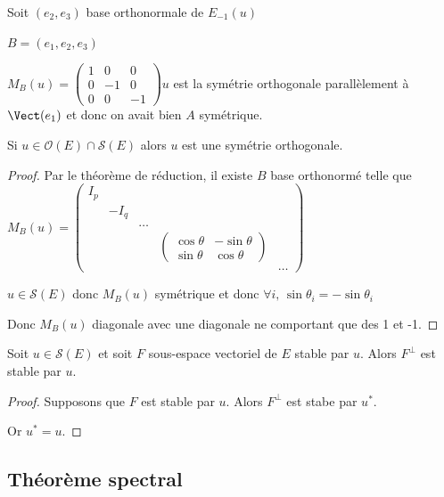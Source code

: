 \begin{exemple}
    Soit $(e_2, e_3)$ base orthonormale de $E_{-1}(u)$

    $B = (e_1, e_2, e_3)$

    $M_B(u) = \begin{pmatrix}
        1 & 0 & 0 \\
        0 & -1 & 0 \\
        0 & 0 & -1
    \end{pmatrix}$$u$ est la symétrie orthogonale parallèlement à $\Vect (e_1)$ et donc 
    on avait bien $A$ symétrique. 
\end{exemple}

\begin{remarque}
    Si $u \in \mathcal O(E) \cap \mathscr S(E)$ alors $u$ est une symétrie orthogonale. 
\end{remarque}

\begin{proof}
    Par le théorème de réduction, il existe $B$ base orthonormé telle que 
    $M_B(u) = \begin{pmatrix}
        I_p & & & & \\
        & - I_q & & & \\
        & & \dots & & \\
        & & & \begin{pmatrix}
            \cos \theta & - \sin \theta \\
            \sin \theta & \cos \theta 
        \end{pmatrix} & \\
        & & & & \dots 
    \end{pmatrix}$

    $u \in \mathscr S(E)$ donc $M_B(u)$ symétrique et donc 
    $\forall i, \, \sin \theta_i = - \sin \theta_i$

    Donc $M_B(u)$  diagonale avec une diagonale ne comportant que des 1 et -1. 
\end{proof}

\begin{proposition}{}{}
    Soit $u \in \mathscr S(E)$ et soit $F$ sous-espace vectoriel de $E$ stable par $u$. 
    Alors $F^\perp$ est stable par $u$. 
\end{proposition}

\begin{proof}
    Supposons que $F$ est stable par $u$. Alors $F^\perp$ est stabe par $u^*$. 

    Or $u^* = u$. 
\end{proof}

\subsection{Théorème spectral}

